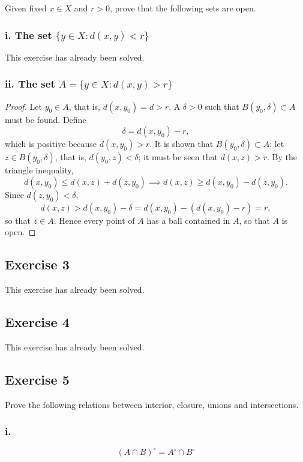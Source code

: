 \documentclass[11pt, a4paper]{article}
\begin{document}
Given fixed $x \in X$ and $r > 0$, prove that the following sets are open.

\subsubsection*{i. The set $\{y \in X : d(x, y) < r\}$}

This exercise has already been solved.

\subsubsection*{ii. The set $A = \{y \in X : d(x, y) > r\}$}

\begin{proof}
Let $y_0 \in A$, that is, $d(x, y_0) = d > r$. A $\delta > 0$ such that
$B(y_0, \delta) \subset A$ must be found. Define
$$ \delta = d(x, y_0) - r, $$
which is positive because $d(x, y_0) > r$. It is shown that $B(y_0, \delta) \subset A$: let
$z \in B(y_0, \delta)$, that is, $d(y_0, z) < \delta$; it must be seen that $d(x, z) > r$. By the
triangle inequality,
$$ d(x, y_0) \le d(x, z) + d(z, y_0) \implies d(x, z) \ge d(x, y_0) - d(z, y_0). $$
Since $d(z, y_0) < \delta$,
$$ d(x, z) > d(x, y_0) - \delta = d(x, y_0) - (d(x, y_0) - r) = r, $$
so that $z \in A$. Hence every point of $A$ has a ball contained in $A$, so that $A$ is
open.
\end{proof}

\subsection*{Exercise 3}

This exercise has already been solved.

\subsection*{Exercise 4}

This exercise has already been solved.

\subsection*{Exercise 5}

Prove the following relations between interior, closure, unions and intersections.

\subsubsection*{i.}
$$ (A \cap B)^\circ = A^\circ \cap B^\circ $$
\end{document}
